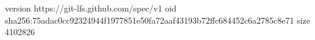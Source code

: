 version https://git-lfs.github.com/spec/v1
oid sha256:75adac0cc92324944f1977851e50fa72aaf43193b72ffc684452c6a2785c8e71
size 4102826
